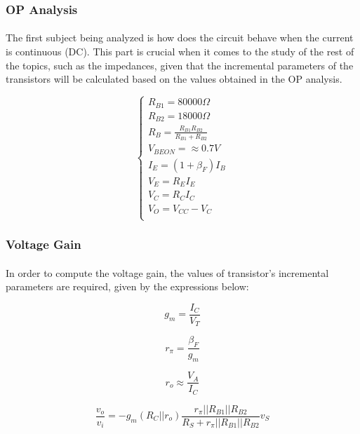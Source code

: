 \subsubsection{OP Analysis}

\paragraph{}The first subject being analyzed is how does the circuit behave when the current is continuous (DC). This part is crucial when it comes to the study of the rest of the topics, such as the impedances, given that the incremental parameters of the transistors will be calculated based on the values obtained in the OP analysis.


\[ 
\left\{\begin{matrix}
	R_{B1}= 80000 \Omega\\
	R_{B2}= 18000 \Omega\\
	R_B=\frac{R_{B1}R_{B2}}{R_{B1}+R_{B2}}\\
	V_{BEON}=\approx 0.7 V\\
	I_E=(1+\beta_F)I_B\\
	V_E=R_E I_E\\
	V_C=R_C I_C\\
	V_O=V_{CC}-V_C\\
\end{matrix}\right.
\]


\subsubsection{Voltage Gain}


\paragraph{}In order to compute the voltage gain, the values of transistor's incremental parameters are required, given by the expressions below: 

\begin{equation}
    g_m=\frac{I_C}{V_T}
\end{equation}

\begin{equation}
    r_\pi=\frac{\beta_F}{g_m}
\end{equation}

\begin{equation}
    r_o\approx\frac{V_A}{I_C}
\end{equation}


\begin{equation}
    \frac{v_o}{v_i}=-g_m(R_C||r_o)\frac{r_\pi||R_{B1}||R_{B2}}{R_S+r_\pi||R_{B1}||R_{B2}}v_S
\end{equation}

